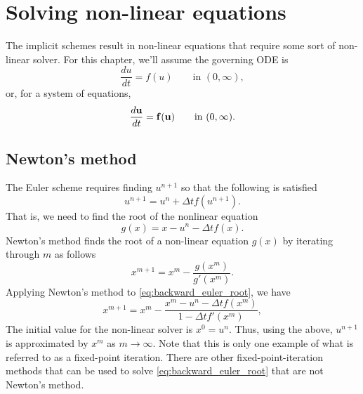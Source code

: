 \documentclass[oneside,a4paper,11pt]{report}
\begin{document}
\chapter{Solving non-linear equations}
The implicit schemes result in non-linear equations that require some sort of non-linear solver. For this chapter, we'll assume the governing ODE is
\begin{equation}
\label{eq:time_stepping_ode}
    \frac{du}{dt} = f(u) \qquad \text{in }(0,\infty),
\end{equation}
or, for a system of equations,
\begin{equation}
\label{eq:time_stepping_ode_system}
    \frac{d\mathbf{u}}{dt} = \mathbf{f}(\mathbf{u}) \qquad \text{in }(0,\infty).
\end{equation}

\section{Newton's method}
The Euler scheme requires finding $u^{n+1}$ so that the following is satisfied 
\begin{equation}
    u^{n+1} = u^n + \Delta t f(u^{n+1}).
\end{equation}
That is, we need to find the root of the nonlinear equation 
\begin{equation}
\label{eq:backward_euler_root}
    g(x) = x - u^n - \Delta t f(x).
\end{equation}
Newton's method finds the root of a non-linear equation $g(x)$ by iterating through $m$ as follows
\begin{equation}
    x^{m+1}=x^m - \frac{g(x^m)}{g'(x^m)}.
\end{equation}
Applying Newton's method to \cref{eq:backward_euler_root}, we have
\begin{equation}
\label{eq:backward_euler_newtons_method_scalar}
    x^{m+1} = x^m - \frac{x^m - u^n - \Delta t f(x^m)}{1 - \Delta t f'(x^m)},
\end{equation}
The initial value for the non-linear solver is $x^0 = u^n$. Thus, using the above, $u^{n+1}$ is approximated by $x^m$ as $m\to\infty$. Note that this is only one example of what is referred to as a fixed-point iteration. There are other fixed-point-iteration methods that can be used to solve \cref{eq:backward_euler_root} that are not Newton's method.
\end{document}
